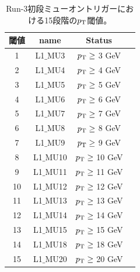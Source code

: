 \begin{table}[]
    \caption{Run-3初段ミューオントリガーにおける15段階の$p_{\rm{T}}$閾値\cite{article:shiomi-mron}。}
    \label{pt_number}
    \centering
    \begin{tabular}{|c|c|c|c|}
        \hline
        閾値 & name & Status\\
        \hline
        1 & L1$\_$MU3 & $p_{\rm{T}} \geq$ 3 GeV \\
        \hline
        2 & L1$\_$MU4 & $p_{\rm{T}} \geq$ 4 GeV \\
        \hline
        3 & L1$\_$MU5 & $p_{\rm{T}} \geq$ 5 GeV \\
        \hline
        4 & L1$\_$MU6 & $p_{\rm{T}} \geq$ 6 GeV \\
        \hline
        5 & L1$\_$MU7 & $p_{\rm{T}} \geq$ 7 GeV \\
        \hline
        6 & L1$\_$MU8 & $p_{\rm{T}} \geq$ 8 GeV \\
        \hline
        7 & L1$\_$MU9 & $p_{\rm{T}} \geq$ 9 GeV \\
        \hline
        8 & L1$\_$MU10 & $p_{\rm{T}} \geq$ 10 GeV \\
        \hline
        9 & L1$\_$MU11 & $p_{\rm{T}} \geq$ 11 GeV \\
        \hline
        10 & L1$\_$MU12 & $p_{\rm{T}} \geq$ 12 GeV \\
        \hline
        11 & L1$\_$MU13 & $p_{\rm{T}} \geq$ 13 GeV \\
        \hline
        12 & L1$\_$MU14 & $p_{\rm{T}} \geq$ 14 GeV \\
        \hline
        13 & L1$\_$MU15 & $p_{\rm{T}} \geq$ 15 GeV \\
        \hline
        14 & L1$\_$MU18 & $p_{\rm{T}} \geq$ 18 GeV \\
        \hline
        15 & L1$\_$MU20 & $p_{\rm{T}} \geq$ 20 GeV \\
        \hline
    \end{tabular}
\end{table}

